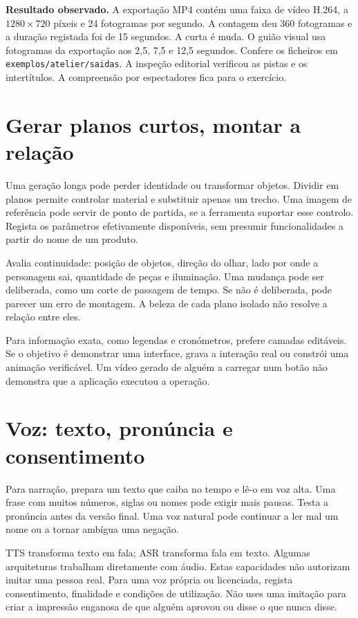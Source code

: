 \textbf{Resultado observado.} A exportação MP4 contém uma faixa de vídeo H.264, a $1280 \times 720$ píxeis e 24 fotogramas por segundo. A contagem deu 360 fotogramas e a duração registada foi de 15 segundos. A curta é muda. O guião visual usa fotogramas da exportação aos 2,5, 7,5 e 12,5 segundos. Confere os ficheiros em \nolinkurl{exemplos/atelier/saidas}. A inspeção editorial verificou as pistas e os intertítulos. A compreensão por espectadores fica para o exercício.

\section{Gerar planos curtos, montar a relação}
Uma geração longa pode perder identidade ou transformar objetos. Dividir em planos permite controlar material e substituir apenas um trecho. Uma imagem de referência pode servir de ponto de partida, se a ferramenta suportar esse controlo. Regista os parâmetros efetivamente disponíveis, sem presumir funcionalidades a partir do nome de um produto.

Avalia continuidade: posição de objetos, direção do olhar, lado por onde a personagem sai, quantidade de peças e iluminação. Uma mudança pode ser deliberada, como um corte de passagem de tempo. Se não é deliberada, pode parecer um erro de montagem. A beleza de cada plano isolado não resolve a relação entre eles.

Para informação exata, como legendas e cronómetros, prefere camadas editáveis. Se o objetivo é demonstrar uma interface, grava a interação real ou constrói uma animação verificável. Um vídeo gerado de alguém a carregar num botão não demonstra que a aplicação executou a operação.

\section{Voz: texto, pronúncia e consentimento}
Para narração, prepara um texto que caiba no tempo e lê-o em voz alta. Uma frase com muitos números, siglas ou nomes pode exigir mais pausas. Testa a pronúncia antes da versão final. Uma voz natural pode continuar a ler mal um nome ou a tornar ambígua uma negação.

TTS transforma texto em fala; ASR transforma fala em texto. Algumas arquiteturas trabalham diretamente com áudio. Estas capacidades não autorizam imitar uma pessoa real. Para uma voz própria ou licenciada, regista consentimento, finalidade e condições de utilização. Não uses uma imitação para criar a impressão enganosa de que alguém aprovou ou disse o que nunca disse.

